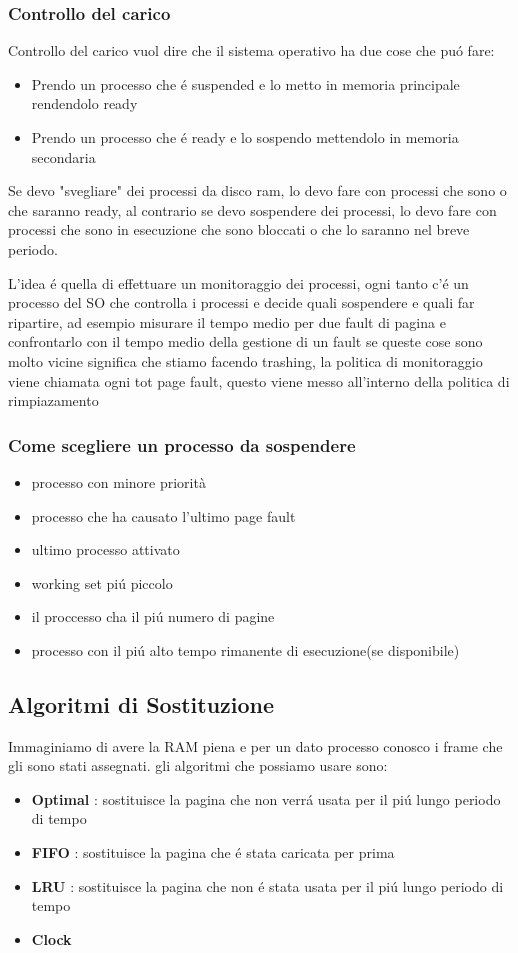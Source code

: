     \subsubsection*{Controllo del carico}
    Controllo del carico vuol dire che il sistema operativo ha due cose che puó fare:
    \begin{itemize}
        \item Prendo un processo che é suspended e lo metto in memoria principale rendendolo ready
        \item Prendo un processo che é ready e lo sospendo mettendolo in memoria secondaria
    \end{itemize}
    Se devo "svegliare" dei processi da disco \longrightarrow ram, lo devo fare con processi che sono o che saranno ready, al contrario
    se devo sospendere dei processi, lo devo fare con processi che sono in esecuzione che sono bloccati o che lo saranno
    nel breve periodo.

    L'idea é quella di effettuare un monitoraggio dei processi, ogni tanto c'é un processo del SO che controlla
    i processi e decide quali sospendere e quali far ripartire, ad esempio misurare il tempo medio per due fault di pagina
    e confrontarlo con il tempo medio della gestione di un fault se queste cose sono molto vicine significa che stiamo facendo
    trashing, la politica di monitoraggio viene chiamata ogni tot page fault, questo viene messo all'interno della politica di rimpiazamento
    \subsubsection*{Come scegliere un processo da sospendere}
    \begin{itemize}
        \item processo con minore priorità
        \item processo che ha causato l'ultimo page fault
        \item ultimo processo attivato
        \item working set piú piccolo
        \item il proccesso cha il piú numero di pagine
        \item processo con il piú alto tempo rimanente di esecuzione(se disponibile)
    \end{itemize}
    \subsection{Algoritmi di Sostituzione}
    Immaginiamo di avere la RAM piena e per un dato processo conosco i frame che gli sono stati assegnati.
    gli algoritmi che possiamo usare sono:
    \begin{itemize}
        \item \textbf{Optimal} : sostituisce la pagina che non verrá usata per il piú lungo periodo di tempo
        \item \textbf{FIFO} : sostituisce la pagina che é stata caricata per prima
        \item \textbf{LRU} : sostituisce la pagina che non é stata usata per il piú lungo periodo di tempo
        \item \textbf{Clock}
    \end{itemize}
